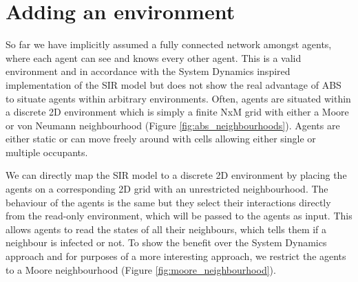 \section{Adding an environment}
\label{sec:adding_env}
So far we have implicitly assumed a fully connected network amongst agents, where each agent can see and knows every other agent. This is a valid environment and in accordance with the System Dynamics inspired implementation of the SIR model but does not show the real advantage of ABS to situate agents within arbitrary environments. Often, agents are situated within a discrete 2D environment \cite{epstein_growing_1996} which is simply a finite NxM grid with either a Moore or von Neumann neighbourhood (Figure \ref{fig:abs_neighbourhoods}). Agents are either static or can move freely around with cells allowing either single or multiple occupants.

We can directly map the SIR model to a discrete 2D environment by placing the agents on a corresponding 2D grid with an unrestricted neighbourhood. The behaviour of the agents is the same but they select their interactions directly from the read-only environment, which will be passed to the agents as input. This allows agents to read the states of all their neighbours, which tells them if a neighbour is infected or not. To show the benefit over the System Dynamics approach  and for purposes of a more interesting approach, we restrict the agents to a Moore neighbourhood (Figure \ref{fig:moore_neighbourhood}).

